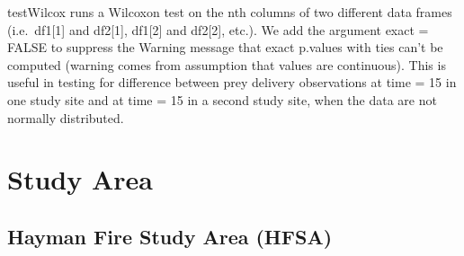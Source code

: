 \documentclass[
]{article}
\newenvironment{Shaded}{\begin{snugshade}}{\end{snugshade}}
\newcommand{\AttributeTok}[1]{\textcolor[rgb]{0.77,0.63,0.00}{#1}}
\newcommand{\CommentTok}[1]{\textcolor[rgb]{0.56,0.35,0.01}{\textit{#1}}}
\newcommand{\ConstantTok}[1]{\textcolor[rgb]{0.00,0.00,0.00}{#1}}
\newcommand{\ControlFlowTok}[1]{\textcolor[rgb]{0.13,0.29,0.53}{\textbf{#1}}}
\newcommand{\FunctionTok}[1]{\textcolor[rgb]{0.00,0.00,0.00}{#1}}
\newcommand{\NormalTok}[1]{#1}
\newcommand{\OtherTok}[1]{\textcolor[rgb]{0.56,0.35,0.01}{#1}}
\newcommand{\SpecialCharTok}[1]{\textcolor[rgb]{0.00,0.00,0.00}{#1}}
\begin{document}
testWilcox runs a Wilcoxon test on the nth columns of two different data
frames (i.e.~df1{[}1{]} and df2{[}1{]}, df1{[}2{]} and df2{[}2{]},
etc.). We add the argument exact = FALSE to suppress the Warning message
that exact p.values with ties can't be computed (warning comes from
assumption that values are continuous). This is useful in testing for
difference between prey delivery observations at time = 15 in one study
site and at time = 15 in a second study site, when the data are not
normally distributed.

\begin{Shaded}
\end{Shaded}

\hypertarget{study-area}{%
\section{Study Area}\label{study-area}}

\hypertarget{hayman-fire-study-area-hfsa}{%
\subsection{Hayman Fire Study Area
(HFSA)}\label{hayman-fire-study-area-hfsa}}
\end{document}
